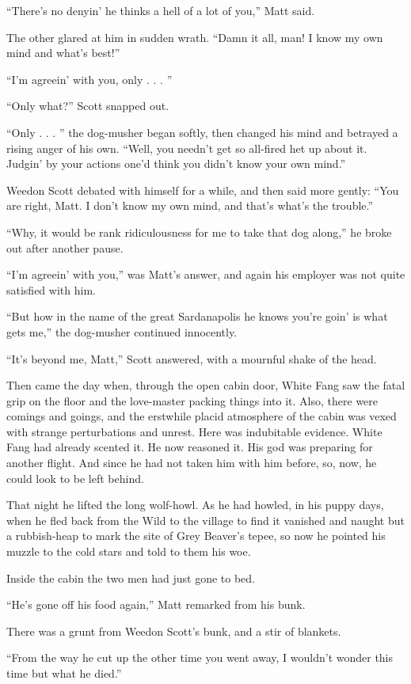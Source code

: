 \documentclass[10pt]{book}
\begin{document}
“There’s no denyin’ he thinks a hell of a lot of you,” Matt said.

The other glared at him in sudden wrath. “Damn it all, man! I know my
own mind and what’s best!”

“I’m agreein’ with you, only . . . ”

“Only what?” Scott snapped out.

“Only . . . ” the dog-musher began softly, then changed his mind and
betrayed a rising anger of his own. “Well, you needn’t get so all-fired
het up about it. Judgin’ by your actions one’d think you didn’t know
your own mind.”

Weedon Scott debated with himself for a while, and then said more
gently: “You are right, Matt. I don’t know my own mind, and that’s
what’s the trouble.”

“Why, it would be rank ridiculousness for me to take that dog along,”
he broke out after another pause.

“I’m agreein’ with you,” was Matt’s answer, and again his employer was
not quite satisfied with him.

“But how in the name of the great Sardanapolis he knows you’re goin’ is
what gets me,” the dog-musher continued innocently.

“It’s beyond me, Matt,” Scott answered, with a mournful shake of the
head.

Then came the day when, through the open cabin door, White Fang saw the
fatal grip on the floor and the love-master packing things into it.
Also, there were comings and goings, and the erstwhile placid
atmosphere of the cabin was vexed with strange perturbations and
unrest. Here was indubitable evidence. White Fang had already scented
it. He now reasoned it. His god was preparing for another flight. And
since he had not taken him with him before, so, now, he could look to
be left behind.

That night he lifted the long wolf-howl. As he had howled, in his puppy
days, when he fled back from the Wild to the village to find it
vanished and naught but a rubbish-heap to mark the site of Grey
Beaver’s tepee, so now he pointed his muzzle to the cold stars and told
to them his woe.

Inside the cabin the two men had just gone to bed.

“He’s gone off his food again,” Matt remarked from his bunk.

There was a grunt from Weedon Scott’s bunk, and a stir of blankets.

“From the way he cut up the other time you went away, I wouldn’t wonder
this time but what he died.”
\end{document}
